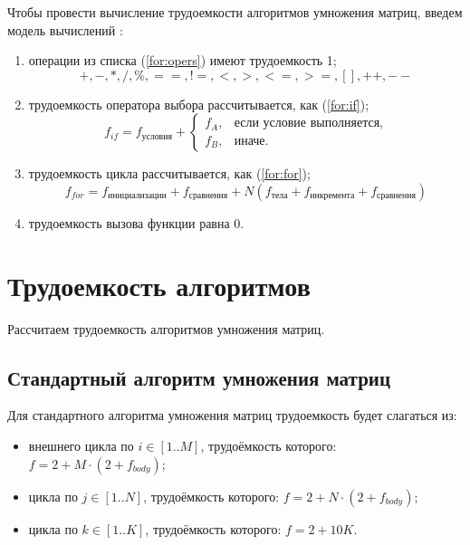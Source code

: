 Чтобы провести вычисление трудоемкости алгоритмов умножения матриц, введем модель вычислений \cite{model}:

\begin{enumerate}
	\item операции из списка (\ref{for:opers}) имеют трудоемкость 1;
	\begin{equation}
		\label{for:opers}
		+, -, *, /, \%, ==, !=, <, >, <=, >=, [], ++, {-}-
	\end{equation}
	\item трудоемкость оператора выбора  рассчитывается, как (\ref{for:if});
	\begin{equation}
		\label{for:if}
		f_{if} = f_{\text{условия}} +
		\begin{cases}
			f_A, & \text{если условие выполняется,}\\
			f_B, & \text{иначе.}
		\end{cases}
	\end{equation}
	\item трудоемкость цикла рассчитывается, как (\ref{for:for});
	\begin{equation}
		\label{for:for}
		f_{for} = f_{\text{инициализации}} + f_{\text{сравнения}} + N(f_{\text{тела}} + f_{\text{инкремента}} + f_{\text{сравнения}})
	\end{equation}
	\item трудоемкость вызова функции равна 0.
\end{enumerate}


\section{Трудоемкость алгоритмов}

Рассчитаем трудоемкость алгоритмов умножения матриц.

\subsection{Стандартный алгоритм умножения матриц}

Для стандартного алгоритма умножения матриц трудоемкость будет слагаться из:

\begin{itemize}
	\item внешнего цикла по $i \in [1..M]$, трудоёмкость которого: $f = 2 + M \cdot (2 + f_{body})$;
	\item цикла по $j \in [1..N]$, трудоёмкость которого: $f = 2 + N \cdot (2 + f_{body})$;
	\item цикла по $k \in [1..K]$, трудоёмкость которого: $f = 2 + 10K$. \newline
\end{itemize}

